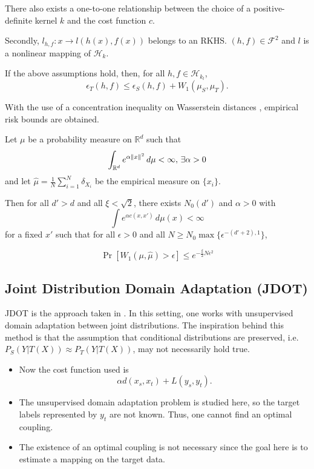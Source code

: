 There also exists a one-to-one relationship between the choice of a positive-definite kernel $k$ and the cost function $c$.

Secondly, $l_{h,f}:x\to l(h(x),f(x))$ belongs to an RKHS. $(h,f)\in \mathcal{F}^2$ and $l$ is a nonlinear mapping of $\mathcal{H}_k$.

\medskip

\begin{lemma}
	If the above assumptions hold, then, for all $h,f\in \mathcal{H}_{k_l}$, 
	\[ \epsilon_T(h,f)\leq \epsilon_S(h,f) + W_1(\mu_S,\mu_T). \]
\end{lemma}

With the use of a concentration inequality on Wasserstein distances \cite{Bolley2007}, empirical risk bounds are obtained.

\begin{theorem}
	Let $\mu$ be a probability measure on $\mathbb{R}^d$ such that
	\[
	\int_{\mathbb{R}^d} e^{\alpha \lVert x\rVert^2}\,d\mu < \infty, \, \exists \alpha > 0
	\]
	and let $\hat{\mu}=\frac{1}{N}\sum_{i=1}^N \delta_{X_i}$ be the empirical measure on $\{x_i\}$.
	
	Then for all $d'>d$ and all $\xi < \sqrt{2}$, there exists $N_0(d')$ and $\alpha > 0$ with
	\[
	\int e^{\alpha c(x,x')}\,d\mu(x) < \infty
	\]
	for a fixed $x'$ such that for all $\epsilon > 0$ and all $N\geq N_0 \max \{\epsilon^{-(d'+2),1}\}$,
	
	\[
	\Pr[W_1(\mu,\hat{\mu})>\epsilon] \leq e^{-\frac{\xi}{2} N\epsilon^2}
	\]
\end{theorem}

\subsection*{Joint Distribution Domain Adaptation (JDOT)}
JDOT is the approach taken in \cite{Courty2017}. In this setting, one works with unsupervised domain adaptation between joint distributions. The inspiration behind this method is that the assumption that  conditional distributions are preserved, i.e. $P_S(Y|T(X))\approx P_T(Y|T(X))$, may not necessarily hold true.
\begin{itemize}
	\item Now the cost function used is \[\alpha d(x_s,x_t) + L(y_s,y_t).\]
	\item The unsupervised domain adaptation problem is studied here, so the target labels represented by $y_t$ are not known. Thus, one cannot find an optimal coupling.
	\item The existence of an optimal coupling is not necessary since the goal here is to estimate a mapping on the target data.
\end{itemize}

